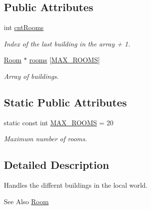 \subsection*{Public Attributes}
\begin{DoxyCompactItemize}
\item 
int \hyperlink{classShipRooms_abfd5908b44d8d104c0357035db2a11a0}{cnt\-Rooms}
\begin{DoxyCompactList}\small\item\em Index of the last building in the array + 1. \end{DoxyCompactList}\item 
\hyperlink{classRoom}{Room} $\ast$ \hyperlink{classShipRooms_a52ced61edb73b269c13ad86c37d58678}{rooms} \mbox{[}\hyperlink{classShipRooms_a4c6a08678ec28bde999016e8980b7493}{M\-A\-X\-\_\-\-R\-O\-O\-M\-S}\mbox{]}
\begin{DoxyCompactList}\small\item\em Array of buildings. \end{DoxyCompactList}\end{DoxyCompactItemize}
\subsection*{Static Public Attributes}
\begin{DoxyCompactItemize}
\item 
static const int \hyperlink{classShipRooms_a4c6a08678ec28bde999016e8980b7493}{M\-A\-X\-\_\-\-R\-O\-O\-M\-S} = 20
\begin{DoxyCompactList}\small\item\em Maximum number of rooms. \end{DoxyCompactList}\end{DoxyCompactItemize}


\subsection{Detailed Description}
Handles the differnt buildings in the local world. 

\begin{DoxySeeAlso}{See Also}
\hyperlink{classRoom}{Room} 
\end{DoxySeeAlso}


